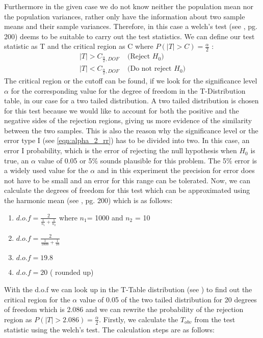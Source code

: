 Furthermore in the given case we do not know neither the population mean nor the population variances, rather only have the information about two sample means and their sample variances. Therefore, in this case a welch's test (see \cite{Iubh:2021}, pg. 200) deems to be suitable to carry out the test statistics. We can define our test statistic as T and the critical region as C where $P(|T| > C) =\frac{\alpha}{2}$ \label{eqn:alpha_2_rr}:
\begin{equation}
    \begin{split}
      |T| > C_{\frac{\alpha}{2}, DOF}& \text{ (Reject $H_0$)}\\
      |T| < C_{\frac{\alpha}{2}, DOF}& \text{ (Do not reject $H_0$)}
    \end{split}
\end{equation}
The critical region or the cutoff can be found, if we look for the significance level $\alpha$ for the corresponding value for the degree of freedom in the T-Distribution table, in our case for a two tailed distribution. A two tailed distribution is chosen for this test because we would like to account for both the positive and the negative sides of the rejection regions, giving us more evidence of the similarity between the two samples. This is also the reason why the significance level or the error type I (see \ref{eqn:alpha_2_rr}) has to be divided into two. \newline \newline
In this case, an error I probability, which is the error of rejecting the null hypothesis when $H_0$ is true, an $\alpha$ value of 0.05 or 5\% sounds plausible for this problem. The 5\% error is a widely used value for the $\alpha$ and in this experiment the precision for error does not have to be small and an error for this range can be tolerated. Now, we can calculate the degrees of freedom for this test which can be approximated using the harmonic mean (see \cite{Iubh:2021}, pg. 200) which is as follows:
\begin{enumerate}
    \item $d.o.f = \frac{2}{\frac{1}{n_1}+\frac{1}{n_2}}$ where $n_1$= 1000 and $n_2$ = 10
    \item $d.o.f = \frac{2}{\frac{1}{1000}+\frac{1}{10}}$
    \item $d.o.f = 19.8$
    \item $d.o.f = 20$ ( rounded up)
\end{enumerate}
With the d.o.f we can look up in the T-Table distribution (see \cite{t-table}) to find out the critical region for the $\alpha$ value of 0.05 of the two tailed distribution for 20 degrees of freedom which is 2.086 and we can rewrite the probability of the rejection region as $P(|T| > 2.086) = \frac{\alpha}{2}$. Firstly, we calculate the $T_{obv}$ from the test statistic using the welch's test. The calculation steps are as follows:
